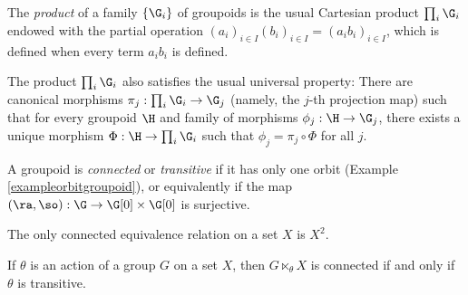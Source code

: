 \begin{definition}
The \emph{product} of a family $\left\{\G_i\right\}$ of groupoids is the usual Cartesian product $\prod_i\G_i$ endowed with the partial operation $(a_i)_{i\in I}(b_i)_{i\in I}=(a_ib_i)_{i\in I}$, which is defined when every term $a_ib_i$ is defined.
\end{definition}

The product $\prod_i\G_i$ also satisfies the usual universal property: There are canonical morphisms $\pi_j:\prod_i\G_i\to\G_j$ (namely, the $j$-th projection map) such that for every groupoid $\H$ and family of morphisms $\phi_j:\H\to\G_j$, there exists a unique morphism $\Phi:\H\to\prod_i\G_i$ such that $\phi_j=\pi_j\circ \Phi$ for all $j$.



\begin{definition}[\cite{MR1712872,MR0244443}]
A groupoid is \emph{connected} or \emph{transitive} if it has only one orbit (Example \ref{exampleorbitgroupoid}), or equivalently if the map $(\ra,\so):\G\to\G[0]\times\G[0]$ is surjective.
\end{definition}


\begin{example}
The only connected equivalence relation on a set $X$ is $X^2$.
\end{example}

\begin{example}
If $\theta$ is an action of a group $G$ on a set $X$, then $G\ltimes_\theta X$ is connected if and only if $\theta$ is transitive.
\end{example}

